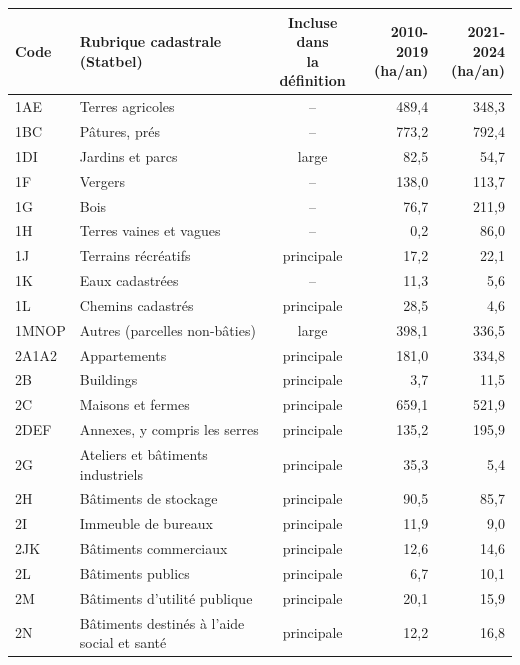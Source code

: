 \begin{tabular}{llcrr}
\toprule
Code & Rubrique cadastrale (Statbel) & \makecell{Incluse dans\\la définition} & \makecell{2010-2019\\(ha/an)} & \makecell{2021-2024\\(ha/an)} \\
\midrule
1AE & Terres agricoles & -- & \textminus{}489{,}4 & \textminus{}348{,}3 \\
1BC & Pâtures, prés & -- & \textminus{}773{,}2 & \textminus{}792{,}4 \\
1DI & Jardins et parcs & large & \textminus{}82{,}5 & \textminus{}54{,}7 \\
1F & Vergers & -- & \textminus{}138{,}0 & \textminus{}113{,}7 \\
1G & Bois & -- & \textminus{}76{,}7 & \textminus{}211{,}9 \\
1H & Terres vaines et vagues & -- & 0{,}2 & \textminus{}86{,}0 \\
1J & Terrains récréatifs & principale & 17{,}2 & 22{,}1 \\
1K & Eaux cadastrées & -- & 11{,}3 & 5{,}6 \\
1L & Chemins cadastrés & principale & 28{,}5 & 4{,}6 \\
1MNOP & Autres (parcelles non-bâties) & large & 398{,}1 & 336{,}5 \\
2A1A2 & Appartements & principale & 181{,}0 & 334{,}8 \\
2B & Buildings & principale & 3{,}7 & \textminus{}11{,}5 \\
2C & Maisons et fermes & principale & 659{,}1 & 521{,}9 \\
2DEF & Annexes, y compris les serres & principale & 135{,}2 & 195{,}9 \\
2G & Ateliers et bâtiments industriels & principale & \textminus{}35{,}3 & \textminus{}5{,}4 \\
2H & Bâtiments de stockage & principale & 90{,}5 & 85{,}7 \\
2I & Immeuble de bureaux & principale & 11{,}9 & 9{,}0 \\
2JK & Bâtiments commerciaux & principale & 12{,}6 & \textminus{}14{,}6 \\
2L & Bâtiments publics & principale & \textminus{}6{,}7 & \textminus{}10{,}1 \\
2M & Bâtiments d’utilité publique & principale & 20{,}1 & 15{,}9 \\
2N & Bâtiments destinés à l’aide social et santé & principale & 12{,}2 & 16{,}8 \\

\end{tabular}
